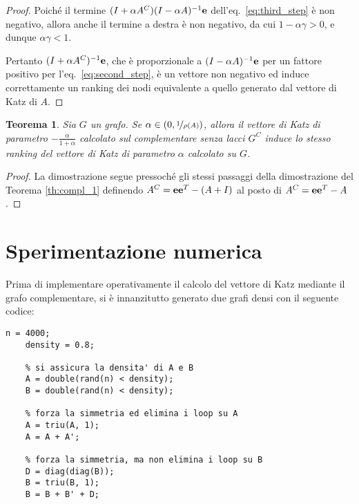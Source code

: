 \documentclass[a4paper]{article}
\newcommand{\evec}{{\bf e}}
\newtheorem{theorem}{Teorema}
\begin{document}
\begin{proof}
    Poiché il termine $(I + \alpha A^C) (I-\alpha A)^{-1} \evec$ dell'eq.~\eqref{eq:third_step} è non negativo, allora
    anche il termine a destra è non negativo, da cui
    $1 - \alpha \gamma > 0$, e dunque $\alpha \gamma < 1$.

    Pertanto $(I + \alpha A^C)^{-1} \evec$, che è proporzionale a $(I-\alpha A)^{-1} \evec$ per un fattore positivo per
    l'eq.~\eqref{eq:second_step}, è un vettore non negativo ed induce correttamente un ranking dei nodi equivalente
    a quello generato dal vettore di Katz di $A$.
\end{proof}

\begin{theorem}
    \label{th:compl_2}
    Sia $G$ un grafo. Se $\alpha \in (0, \nicefrac{1}{\rho(A)})$, allora il vettore di Katz di parametro $-\frac{\alpha}{1+\alpha}$ calcolato sul complementare senza lacci $G^C$
    induce lo stesso ranking del vettore di Katz di parametro $\alpha$ calcolato su $G$.
\end{theorem}

\begin{proof}
    La dimostrazione segue pressoché gli stessi passaggi della dimostrazione del Teorema \ref{th:compl_1} definendo
    $A^C = \evec \evec^T - (A+I)$ al posto di $A^C = \evec \evec^T - A$.
\end{proof}

\section{Sperimentazione numerica}

Prima di implementare operativamente il calcolo del vettore di Katz mediante il grafo complementare, si è innanzitutto generato
due grafi densi con il seguente codice:

\begin{lstlisting}[style=Matlab-editor]
    n = 4000;
    density = 0.8;

    % si assicura la densita' di A e B
    A = double(rand(n) < density);
    B = double(rand(n) < density);

    % forza la simmetria ed elimina i loop su A
    A = triu(A, 1);
    A = A + A';

    % forza la simmetria, ma non elimina i loop su B
    D = diag(diag(B));
    B = triu(B, 1);
    B = B + B' + D;
\end{lstlisting}

\printbibliography
\end{document}
